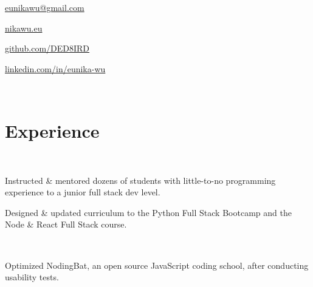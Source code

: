 \documentclass[]{hieudo-build}
\begin{document}
{
	\ci{\faAt} \href{mailto:eunikawu@gmail.com}{ eunikawu@gmail.com } 
	\par
    \ci{\faGlobe} \href{https://nikawu.eu}{ nikawu.eu } \par
	\ci{\faGithub} \href{https://github.com/DED8IRD}{ github.com/DED8IRD } 
	\par
	\ci{\faLinkedinSquare} \href{https://www.linkedin.com/in/eunika-wu/}{ linkedin.com/in/eunika-wu }
	\par
}
\sectionsep \\
\titlerule
\smallskip
%
%
\begin{minipage}[t]{0.63\textwidth} 

\section{Experience}

 \\
\vspace{\topsep}
\begin{tightemize}
\item Instructed \& mentored dozens of students with little-to-no programming experience to a junior full stack dev level. \\
\item Designed \& updated curriculum to the Python Full Stack Bootcamp and the Node \& React Full Stack course. \\
\smallskip
{}
{}
\end{tightemize}
\sectionsep

 \\
\begin{tightemize}
\item Optimized NodingBat, an open source JavaScript coding school, after conducting usability tests. \\
\smallskip
{}
\end{tightemize}
\sectionsep


\end{minipage}
\end{document}

